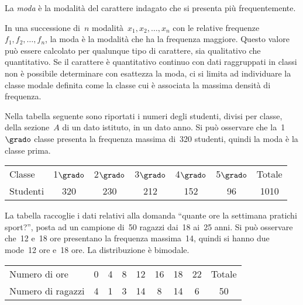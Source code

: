 \begin{definizione}
La \emph{moda} è la modalità del carattere indagato che si presenta più frequentemente.
\end{definizione}

In una successione di~$n$ modalità~$x_1, x_2, \ldots, x_n$
con le relative frequenze~$f_1, f_2, \ldots, f_n$, la moda è la modalità che ha la frequenza maggiore.
Questo valore può essere calcolato per qualunque tipo di carattere, sia qualitativo che quantitativo.
Se il carattere è quantitativo continuo con dati raggruppati in classi non è possibile determinare con esattezza la moda, ci si limita
ad individuare la classe modale definita come la classe cui è associata la massima densità di frequenza.

\begin{exrig}
 \begin{esempio}

 Nella tabella seguente sono riportati i numeri degli studenti, divisi per classe, della sezione~$A$ di un dato istituto,
 in un dato anno. Si può osservare che la~1$\grado$ classe presenta la frequenza massima di~320 studenti, quindi la moda è la classe prima.
\begin{center}
\begin{tabular}{lcccccc}
\toprule
Classe & 1$\grado$ & 2$\grado$ & 3$\grado$ & 4$\grado$ & 5$\grado$ & Totale \\
Studenti & 320 & 230 & 212 & 152 & 96 & 1010 \\
\bottomrule
\end{tabular}
\end{center}
 \end{esempio}

\begin{esempio}
La tabella raccoglie i dati relativi alla domanda ``quante ore la settimana pratichi sport?'', posta ad un
campione di~50 ragazzi dai~18 ai~25 anni. Si può osservare che~12 e~18 ore presentano la frequenza massima~14, quindi si hanno due
mode~12 ore e~18 ore. La distribuzione è bimodale.


\begin{center}
\begin{tabular}{lcccccccc}
\toprule
Numero di ore & 0 &4 &8 &12 &16 &18 &22 &Totale\\
 Numero di ragazzi& 4 & 1 & 3 & 14 & 8 & 14 & 6 & 50 \\
\bottomrule
\end{tabular}
\end{center}
 \end{esempio}


\end{exrig}

